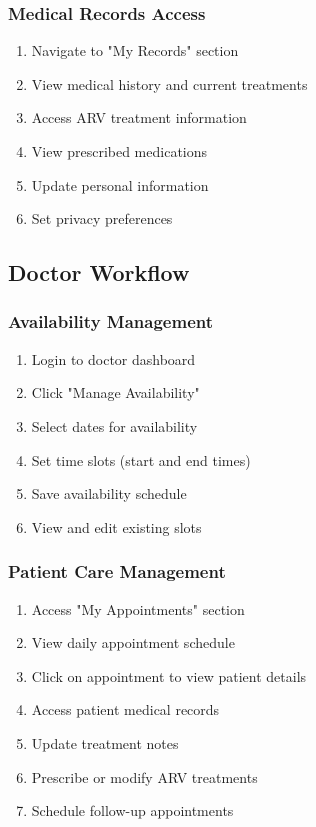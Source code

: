 \documentclass[12pt,a4paper]{article}
\begin{document}
\subsubsection{Medical Records Access}

\begin{enumerate}
    \item Navigate to "My Records" section
    \item View medical history and current treatments
    \item Access ARV treatment information
    \item View prescribed medications
    \item Update personal information
    \item Set privacy preferences
\end{enumerate}

\subsection{Doctor Workflow}

\subsubsection{Availability Management}

\begin{enumerate}
    \item Login to doctor dashboard
    \item Click "Manage Availability"
    \item Select dates for availability
    \item Set time slots (start and end times)
    \item Save availability schedule
    \item View and edit existing slots
\end{enumerate}

\subsubsection{Patient Care Management}

\begin{enumerate}
    \item Access "My Appointments" section
    \item View daily appointment schedule
    \item Click on appointment to view patient details
    \item Access patient medical records
    \item Update treatment notes
    \item Prescribe or modify ARV treatments
    \item Schedule follow-up appointments
\end{enumerate}
\end{document}
